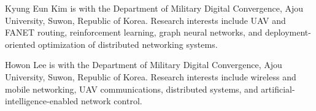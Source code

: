 \documentclass{ieeeaccess}
\begin{document}



\begin{IEEEbiographynophoto}{Kyung Eun Kim}
is with the Department of Military Digital Convergence, Ajou University, Suwon, Republic of Korea. Research interests include UAV and FANET routing, reinforcement learning, graph neural networks, and deployment-oriented optimization of distributed networking systems.
\end{IEEEbiographynophoto}

\begin{IEEEbiographynophoto}{Howon Lee}
is with the Department of Military Digital Convergence, Ajou University, Suwon, Republic of Korea. Research interests include wireless and mobile networking, UAV communications, distributed systems, and artificial-intelligence-enabled network control.
\end{IEEEbiographynophoto}

\EOD
\end{document}
